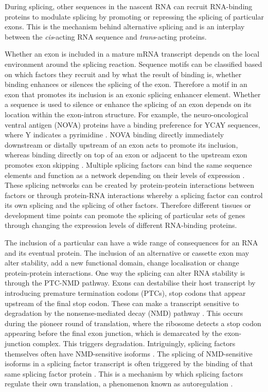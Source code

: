 During splicing, other sequences in the nascent RNA can recruit RNA-binding proteins to modulate splicing by promoting or repressing the splicing of particular exons.
This is the mechanism behind alternative splicing and is an interplay between the \textit{cis}-acting RNA sequence and \textit{trans}-acting proteins.

Whether an exon is included in a mature mRNA transcript depends on the local environment around the splicing reaction.
Sequence motifs can be classified based on which factors they recruit and by what the result of binding is, whether binding enhances or silences the splicing of the exon.
Therefore a motif in an exon that promotes its inclusion is an exonic splicing enhancer element. 
Whether a sequence is used to silence or enhance the splicing of an exon depends on its location within the exon-intron structure.
For example, the neuro-oncological ventral antigen (NOVA) proteins have a binding preference for YCAY sequences, where Y indicates a pyrimidine \citep{Buckanovich1996,Jensen2000}.
NOVA binding directly immediately downstream or distally upstream of an exon acts to promote its inclusion, whereas binding directly on top of an exon or adjacent to the upstream exon promotes exon skipping \citep{Ule2006}.
Multiple splicing factors can bind the same sequence elements and function as a network depending on their levels of expression \citep{Wang2013a}.
These splicing networks can be created by protein-protein interactions between factors or through protein-RNA interactions whereby a splicing factor can control its own splicing and the splicing of other factors. 
Therefore different tissues or development time points can promote the splicing of particular sets of genes through changing the expression levels of different RNA-binding proteins.

The inclusion of a particular can have a wide range of consequences for an RNA and its eventual protein. 
The inclusion of an alternative or cassette exon may alter stability, add a new functional domain, change localisation or change protein-protein interactions.
One way the splicing can alter RNA stability is through the PTC-NMD pathway.
Exons can destabilise their host transcript by introducing premature termination codons (PTCs), stop codons that appear upstream of the final stop codon. 
These can make a transcript sensitive to degradation by the nonsense-mediated decay (NMD) pathway \citep{McGlincy2008-wh}. 
This occurs during the pioneer round of translation, where the ribosome detects a stop codon appearing before the final exon junction, which is demarcated by the exon-junction complex.
This triggers degradation.  %
Intriguingly, splicing factors themselves often have NMD-sensitive isoforms \citep{Ni2007}. 
The splicing of NMD-sensitive isoforms in a splicing factor transcript is often triggered by the binding of that same splicing factor protein \citep{Jangi2014a}. 
This is a mechanism by which splicing factors regulate their own translation, a phenomenon known as autoregulation \citep{Rosenfeld2002}.


